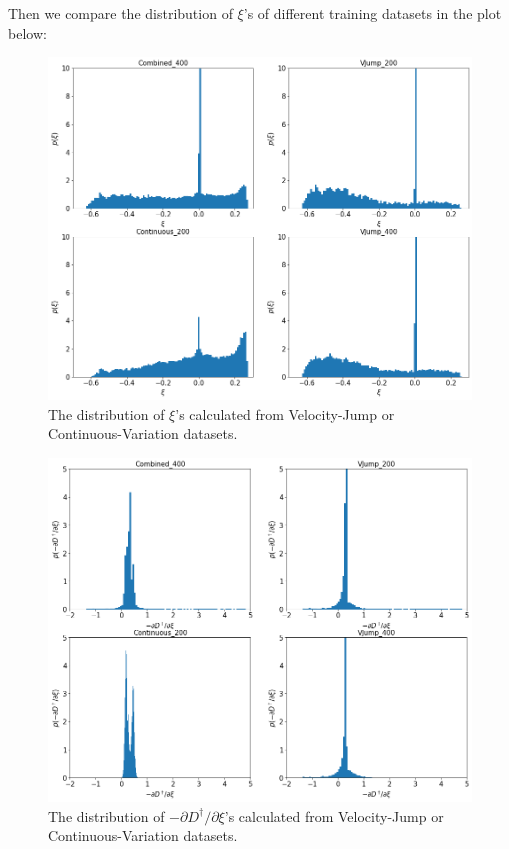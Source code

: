 Then we compare the distribution of $\xi$'s of different training datasets in the plot below:
\begin{figure}[H]
    \centering
    \includegraphics[width=1.0\textwidth]{images/Distri_Xis.png}
    \caption{The distribution of $\xi$'s calculated from Velocity-Jump or Continuous-Variation datasets.}
    \label{fig:DistriXis}
\end{figure}

\begin{figure}[H]
    \centering
    \includegraphics[width=1.0\textwidth]{images/Distri_Dins.png}
    \caption{The distribution of $-\partial D^\dagger / \partial \xi$'s calculated from Velocity-Jump or Continuous-Variation datasets.}
    \label{fig:DistriDins}
\end{figure}

